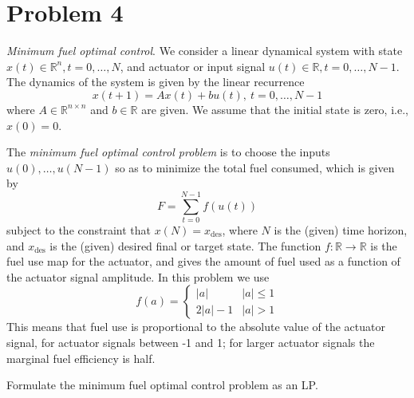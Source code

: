 \documentclass[11pt]{article}
\newcommand{\RR}{\mathbb{R}}
\begin{document}


\clearpage
\section*{Problem 4}
\textit{Minimum fuel optimal control}. We consider a linear dynamical system with state $x(t)\in \RR^n, t=0, \dots, N$, and actuator or input signal $u(t)\in\RR, t=0, \dots, N-1$. The dynamics of the system is given by the linear recurrence
\[
x(t+1) = Ax(t) + bu(t),\ t=0, \dots, N-1
\]
where $A\in\RR^{n\times n}$ and $b\in \RR$ are given. We assume that the initial state is zero, i.e., $x(0) = 0$.

The \textit{minimum fuel optimal control problem} is to choose the inputs $u(0), \dots, u(N-1)$ so as to minimize the total fuel consumed, which is given by
\[
F = \sum_{t=0}^{N-1} f(u(t))
\]
subject to the constraint that $x(N) = x_{\text{des}}$, where $N$ is the (given) time horizon, and $x_{\text{des}}$ is the (given) desired final or target state. The function $f:\RR\rightarrow \RR$ is the fuel use map for the actuator, and gives the amount of fuel used as a function of the actuator signal amplitude. In this problem we use
\[
f(a) = 
\begin{cases}
  |a| & |a| \leq 1\\
  2|a| -1 & |a| >1
\end{cases}
\]
This means that fuel use is proportional to the absolute value of the actuator signal, for actuator signals between -1 and 1; for larger actuator signals the marginal fuel efficiency is half.

Formulate the minimum fuel optimal control problem as an LP.
\end{document}
